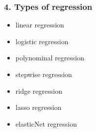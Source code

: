 \documentclass[handout,compress]{beamer} %
\begin{document}
\begin{frame}
	\frametitle{4. Types of regression}
	\begin{itemize}
	\item linear regression
	\item logistic regression
	\item polynominal regression
	\item stepwise regression
	\item ridge regression
	\item lasso regression
	\item elasticNet regression
\end{itemize}		
\end{frame}

\end{document}
